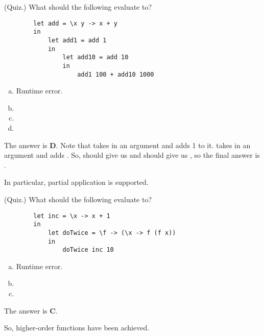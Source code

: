 \documentclass[letterpaper]{article}
\begin{document}
\begin{mdframed}[]
    (Quiz.) What should the following evaluate to? 
    \begin{verbatim}
        let add = \x y -> x + y
        in
            let add1 = add 1
            in
                let add10 = add 10
                in
                    add1 100 + add10 1000\end{verbatim}
    
    \begin{enumerate}[(a)]
        \item Runtime error. 
        \item {}
        \item {}
        \item {}
    \end{enumerate}

    \begin{mdframed}[]
        The answer is \textbf{D}. Note that  takes in an argument and adds 1 to it.  takes in an argument and adds . So,  should give us  and  should give us , so the final answer is .
    \end{mdframed}
\end{mdframed}
In particular, partial application is supported.

\begin{mdframed}[]
    (Quiz.) What should the following evaluate to?
    \begin{verbatim}
        let inc = \x -> x + 1
        in
            let doTwice = \f -> (\x -> f (f x))
            in
                doTwice inc 10 \end{verbatim}
    \begin{enumerate}[(a)]
        \item Runtime error. 
        \item {}
        \item {}
    \end{enumerate}

    \begin{mdframed}[]
        The answer is \textbf{C}.
    \end{mdframed}
\end{mdframed}
So, higher-order functions have been achieved.
\end{document}
